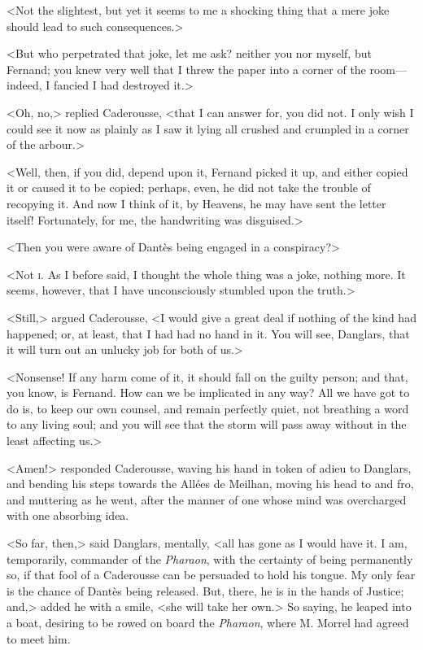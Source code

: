  <Not the slightest, but yet it seems to me a shocking thing that a mere joke should lead to such consequences.> 

 <But who perpetrated that joke, let me ask? neither you nor myself, but Fernand; you knew very well that I threw the paper into a corner of the room—indeed, I fancied I had destroyed it.> 

 <Oh, no,> replied Caderousse, <that I can answer for, you did not. I only wish I could see it now as plainly as I saw it lying all crushed and crumpled in a corner of the arbour.> 

 <Well, then, if you did, depend upon it, Fernand picked it up, and either copied it or caused it to be copied; perhaps, even, he did not take the trouble of recopying it. And now I think of it, by Heavens, he may have sent the letter itself! Fortunately, for me, the handwriting was disguised.> 

 <Then you were aware of Dantès being engaged in a conspiracy?> 

 <Not \textsc{i.} As I before said, I thought the whole thing was a joke, nothing more. It seems, however, that I have unconsciously stumbled upon the truth.> 

 <Still,> argued Caderousse, <I would give a great deal if nothing of the kind had happened; or, at least, that I had had no hand in it. You will see, Danglars, that it will turn out an unlucky job for both of us.> 

 <Nonsense! If any harm come of it, it should fall on the guilty person; and that, you know, is Fernand. How can we be implicated in any way? All we have got to do is, to keep our own counsel, and remain perfectly quiet, not breathing a word to any living soul; and you will see that the storm will pass away without in the least affecting us.> 

 <Amen!> responded Caderousse, waving his hand in token of adieu to Danglars, and bending his steps towards the Allées de Meilhan, moving his head to and fro, and muttering as he went, after the manner of one whose mind was overcharged with one absorbing idea. 

 <So far, then,> said Danglars, mentally, <all has gone as I would have it. I am, temporarily, commander of the \textit{Pharaon}, with the certainty of being permanently so, if that fool of a Caderousse can be persuaded to hold his tongue. My only fear is the chance of Dantès being released. But, there, he is in the hands of Justice; and,> added he with a smile, <she will take her own.> So saying, he leaped into a boat, desiring to be rowed on board the \textit{Pharaon}, where M. Morrel had agreed to meet him. 